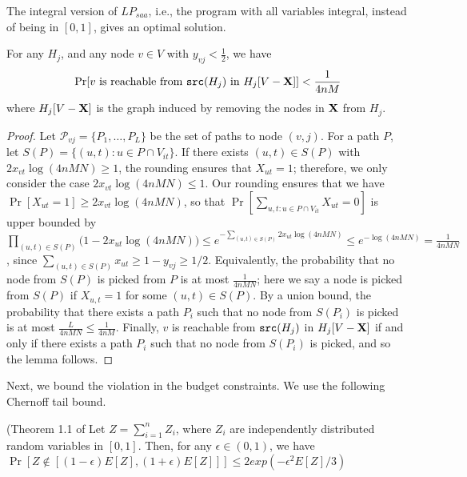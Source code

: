 \begin{lemma}
The integral version of $LP_{saa}$, i.e., the program with all variables integral, instead of being in $[0, 1]$,
gives an optimal solution.
\end{lemma}

\begin{lemma}
\label{lem:disconnect}
For any $H_j$, and any node $v\in V$ with $y_{vj} < \frac{1}{2}$, we have
\[
\Pr[\mbox{$v$ is reachable from $\texttt{src}(H_j)$ in $H_j[V-\mathbf{X}]$}] < \frac{1}{4nM}
\]
where $H_j[V-\mathbf{X}]$ is the graph induced by removing the nodes in $\mathbf{X}$ from $H_j$.
\end{lemma}
\begin{proof}
Let $\mathcal{P}_{vj} = \{P_1, \ldots,P_L\}$ be the  set of paths to node $(v,j)$. 
For a path $P$, let $S(P)=\{(u, t): u\in P\cap V_{it}\}$.
If there exists $(u, t)\in S(P)$ with $2 x_{vt} \log(4nMN) \geq 1$, the rounding ensures that $X_{ut}=1$;
therefore, we only consider the case $2 x_{vt} \log(4nMN)\leq 1$.
Our rounding ensures that we have $\Pr[X_{ut}=1] \geq 2 x_{vt} \log(4nMN)$, so that
$\Pr[\sum_{u, t: u\in P\cap V_{it}} X_{ut} = 0]$ is upper bounded by
$\prod_{(u,t) \in S(P)} \big(1- 2 x_{ut} \log(4nMN)\big) \leq e^{-\sum_{(u, t)\in S(P)} 2 x_{ut} \log(4nMN)}
\leq e^{-\log(4nMN)}= \frac{1}{4nMN}$,
since $\sum_{(u, t)\in S(P)} x_{ut} \geq 1-y_{vj} \geq 1/2$.
Equivalently, the probability that no node from $S(P)$ is picked from $P$ is at most $\frac{1}{4nMN}$;
here we say a node is picked from $S(P)$ if $X_{u,t}=1$ for some $(u, t)\in S(P)$.
By a union bound, the probability that there exists a path $P_i$ such that no node from
$S(P_i)$ is picked is at most $\frac{L}{4nMN}\leq \frac{1}{4nM}$.
Finally, $v$ is reachable from $\texttt{src}(H_j)$ in $H_j[V-\mathbf{X}]$ if and only if there exists a path $P_i$ such that no node from
$S(P_i)$ is picked, and so the lemma follows.
\end{proof}

Next, we bound the violation in the budget constraints. We use the following Chernoff tail bound.

\begin{theorem} (Theorem 1.1 of \cite{books/daglib/0025902}
Let $Z=\sum_{i=1}^n Z_i$, where $Z_i$ are independently distributed random variables in $[0, 1]$. Then, for any $\epsilon\in(0, 1)$, we have
$\Pr[Z\not\in[(1-\epsilon)E[Z], (1+\epsilon)E[Z]]]\leq 2 exp(-\epsilon^2 E[Z]/3)$


\end{theorem}

